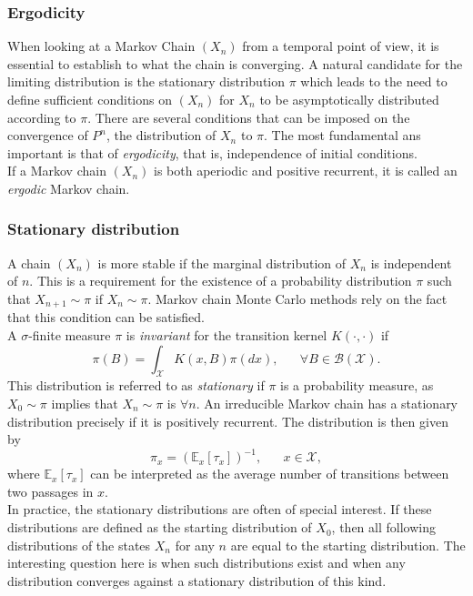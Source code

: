 \subsubsection{Ergodicity}
When looking at a Markov Chain $\left(X_n\right)$ from a temporal point of view, it is essential to establish to what the chain is converging. A natural candidate for the limiting distribution is the stationary distribution $\pi$ which leads to the need to define sufficient conditions on $\left(X_n\right)$ for $X_n$ to be asymptotically distributed according to $\pi$. There are several conditions that can be imposed on the convergence of $P^n$, the distribution of $X_n$ to $\pi$. The most fundamental ans important is that of \textit{ergodicity}, that is, independence of initial conditions. \\
If a Markov chain $\left(X_n\right)$ is both aperiodic and positive recurrent, it is called an \textit{ergodic} Markov chain.
\subsubsection{Stationary distribution} 
A chain $\left(X_n\right)$ is more stable if the marginal distribution of $X_n$ is independent of $n$. This is a requirement for the existence of a probability distribution $\pi$ such that $X_{n+1}\sim\pi$ if $X_n\sim\pi$. Markov chain Monte Carlo methods rely on the fact that this condition can be satisfied. \\
A $\sigma$-finite measure $\pi$ is \textit{invariant} for the transition kernel $K\left(\cdot,\cdot\right)$ if \begin{equation*}
    \pi\left(B\right)=\int_\mathcal{X}K\left(x,B\right)\pi(dx), \hspace{20pt} \forall B\in\mathcal{B}\left(\mathcal{X}\right).
\end{equation*}
This distribution is referred to as \textit{stationary} if $\pi$ is a probability measure, as $X_0\sim\pi$ implies that $X_n\sim\pi$ is $\forall n$. An irreducible Markov chain has a stationary distribution precisely if it is positively recurrent. The distribution is then given by
\begin{equation}
    \pi_x=\left(\mathbb{E}_x\left[\tau_x\right]\right)^{-1}, \hspace{20pt} x\in\mathcal{X},
\end{equation}
where $\mathbb{E}_x\left[\tau_x\right]$ can be interpreted as the average number of transitions between two passages in $x$. \\
In practice, the stationary distributions are often of special interest. If these distributions are defined as the starting distribution of $X_0$, then all following distributions of the states $X_n$ for any $n$ are equal to the starting distribution. The interesting question here is when such distributions exist and when any distribution converges against a stationary distribution of this kind\autocite[Cf.][]{robert2013monte}.
